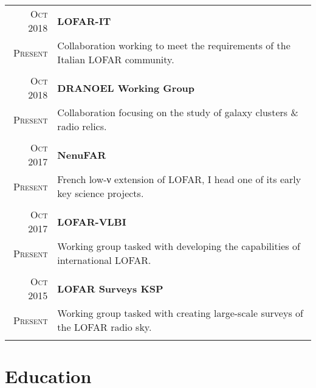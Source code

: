 \documentclass[10pt]{article} %
\begin{document}
\begin{tabular}{r|p{12.5cm}}
	\textsc{Oct 2018} & \textbf{LOFAR-IT}\\
	\textsc{Present}  & Collaboration working to meet the requirements of the Italian LOFAR community.\\
	\multicolumn{2}{c}{} \\
	
	\textsc{Oct 2018} & \textbf{DRANOEL Working Group}\\
	\textsc{Present}  & Collaboration focusing on the study of galaxy clusters \& radio relics.\\
	\multicolumn{2}{c}{} \\

	\textsc{Oct 2017} & \textbf{NenuFAR}\\
	\textsc{Present}  & French low-ν extension of LOFAR, I head one of its early key science projects.\\
	\multicolumn{2}{c}{} \\
	
	\textsc{Oct 2017} & \textbf{LOFAR-VLBI}\\
	\textsc{Present}  &  Working group tasked with developing the capabilities of international LOFAR.\\
	\multicolumn{2}{c}{} \\
	
	\textsc{Oct 2015} & \textbf{LOFAR Surveys KSP}\\
	\textsc{Present}  &  Working group tasked with creating large-scale surveys of the LOFAR radio sky.\\
	\multicolumn{2}{c}{} \\
	
\end{tabular}


\section{Education}
\end{document}

